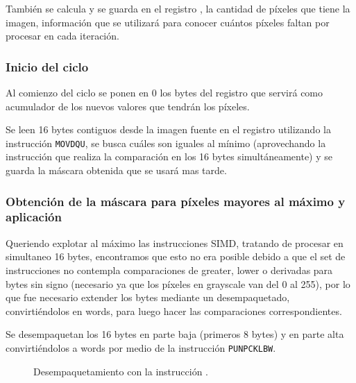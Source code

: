 También se calcula y se guarda en el registro \rcx, la cantidad de píxeles que tiene la imagen, información que se utilizará para conocer cuántos píxeles faltan por procesar en cada iteración.

\subsubsection{Inicio del ciclo}
Al comienzo del ciclo se ponen en 0 los bytes del registro  que servirá como acumulador de los nuevos valores que tendrán los píxeles.

Se leen 16 bytes contiguos desde la imagen fuente en el registro  utilizando la instrucción \texttt{MOVDQU}, se busca cuáles son iguales al mínimo (aprovechando la instrucción  que realiza la comparación en los 16 bytes simultáneamente) y se guarda la máscara obtenida que se usará mas tarde.

\subsubsection{Obtención de la máscara para píxeles mayores al máximo y aplicación}

Queriendo explotar al máximo las instrucciones SIMD, tratando de procesar en simultaneo 16 bytes, encontramos que esto no era posible debido a que el set de instrucciones no contempla comparaciones de greater, lower o derivadas para bytes sin signo (necesario ya que los píxeles en grayscale van del 0 al 255), por lo que fue necesario extender los bytes mediante un desempaquetado, convirtiéndolos en words, para luego hacer las comparaciones correspondientes.

Se desempaquetan los 16 bytes en parte baja (primeros 8 bytes) y en parte alta convirtiéndolos a words por medio de la instrucción \texttt{PUNPCKLBW}.

\begin{figure}[H]
  \centering
  \caption{Desempaquetamiento con la instrucción .}
\end{figure}

